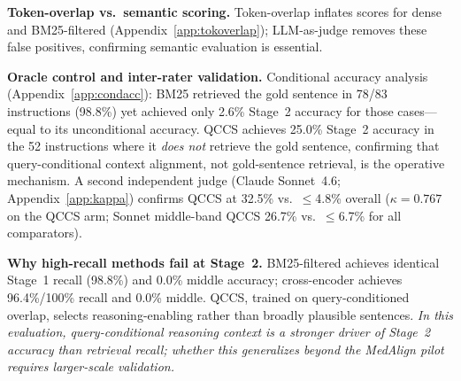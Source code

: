 \documentclass{article}
\begin{document}
\textbf{Token-overlap vs.\ semantic scoring.} Token-overlap inflates scores for
dense and BM25-filtered (Appendix~\ref{app:tokoverlap}); LLM-as-judge removes
these false positives, confirming semantic evaluation is essential.

\textbf{Oracle control and inter-rater validation.}
Conditional accuracy analysis (Appendix~\ref{app:condacc}): BM25 retrieved the
gold sentence in 78/83 instructions (98.8\%) yet achieved only 2.6\% Stage~2
accuracy for those cases---equal to its unconditional accuracy. QCCS achieves
25.0\% Stage~2 accuracy in the 52 instructions where it \emph{does not}
retrieve the gold sentence, confirming that query-conditional context alignment,
not gold-sentence retrieval, is the operative mechanism. A second independent judge (Claude Sonnet~4.6;
Appendix~\ref{app:kappa}) confirms QCCS at 32.5\%
vs.\ $\leq$4.8\% overall ($\kappa = 0.767$ on the QCCS arm; Sonnet
middle-band QCCS 26.7\% vs.\ $\leq$6.7\% for all comparators).

\textbf{Why high-recall methods fail at Stage~2.}
BM25-filtered achieves identical Stage~1 recall (98.8\%) and 0.0\% middle accuracy;
cross-encoder achieves 96.4\%/100\% recall and 0.0\% middle. QCCS, trained on
query-conditioned overlap, selects reasoning-enabling rather than broadly plausible
sentences. \emph{In this evaluation, query-conditional reasoning context is a stronger
driver of Stage~2 accuracy than retrieval recall; whether this generalizes
beyond the MedAlign pilot requires larger-scale validation.}
\end{document}
